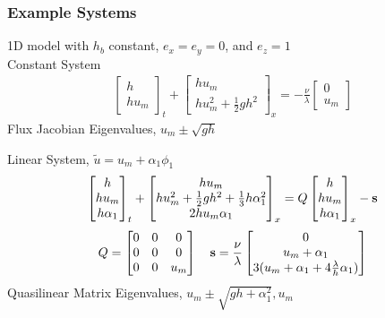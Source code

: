 \documentclass[10pt]{beamer}
\begin{document}
\begin{frame}
  \frametitle{Example Systems}
  1D model with \(h_b\) constant, \(e_x = e_y = 0\), and \(e_z = 1\) \\
  Constant System
  \begin{align*}
    \begin{bmatrix}
      h \\
      h u_m
    \end{bmatrix}_t +
    \begin{bmatrix}
      h u_m \\
      h u_m^2 + \frac{1}{2} g h^2
    \end{bmatrix}_x =
    -\frac{\nu}{\lambda}
    \begin{bmatrix}
      0 \\
      u_m
    \end{bmatrix}
  \end{align*}
  Flux Jacobian Eigenvalues, \(u_m \pm \sqrt{gh}\)

  Linear System, \(\tilde{u} = u_m + \alpha_1 \phi_1\)
  \begin{align*}
    \begin{bmatrix}
      h    \\
      hu_m \\
      h \alpha_1
    \end{bmatrix}_t +
    \begin{bmatrix}
      h u_m                                                \\
      h u_m^2 + \frac{1}{2} gh^2 + \frac{1}{3}h \alpha_1^2 \\
      2 h u_m \alpha_1
    \end{bmatrix}_x = Q
    \begin{bmatrix}
      h    \\
      hu_m \\
      h \alpha_1
    \end{bmatrix}_x - \mathbf{s}
  \end{align*}
  \begin{align*}
    Q =
    \begin{bmatrix}
      0 & 0 & 0   \\
      0 & 0 & 0   \\
      0 & 0 & u_m
    \end{bmatrix} \quad
    \mathbf{s} = \frac{\nu}{\lambda}
    \begin{bmatrix}
      0              \\
      u_m + \alpha_1 \\
      3(u_m + \alpha_1 + 4\frac{\lambda}{h} \alpha_1)
    \end{bmatrix}
  \end{align*}
  Quasilinear Matrix Eigenvalues, \(u_m \pm \sqrt{gh + \alpha_1^2}, u_m\)
\end{frame}
\end{document}
